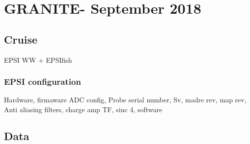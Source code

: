 \chapter{GRANITE- September 2018}

\section{Cruise}
EPSI WW  + EPSIfish 
\subsection{EPSI configuration}
Hardware, firmaware
ADC config, Probe serial number, Sv, madre rev, map rev, Anti aliasing filters, charge amp TF, sinc 4, software


\section{Data}
